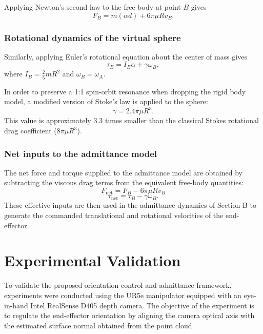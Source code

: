 \documentclass[journal]{IEEEtran}
\begin{document}
Applying Newton's second law to the free body at point $B$ gives
%
\begin{equation}
F_B = m(\alpha d) + 6\pi \mu R v_B.
\end{equation}
%
\subsubsection{Rotational dynamics of the virtual sphere}

Similarly, applying Euler's rotational equation about the center of mass gives
%
\begin{equation}
\tau_B = I_B \alpha + \gamma \omega_B,
\end{equation}
%
where $I_B = \frac{2}{5}mR^2$ and $\omega_B = \omega_A$.

In order to preserve a 1:1 spin-orbit resonance when dropping the rigid body model, a modified version of Stoke's law is applied to the sphere:
%
\begin{equation}
\gamma = 2.4\pi \mu R^3.
\end{equation}
%
This value is approximately $3.3$ times smaller than the classical Stokes rotational drag coefficient ($8\pi\mu R^3$).



\subsubsection{Net inputs to the admittance model}

The net force and torque supplied to the admittance model are obtained by subtracting the viscous drag terms from the equivalent free-body quantities:
%
\begin{equation}
F_{\mathrm{net}} = F_B - 6\pi \mu R v_B
\end{equation}
%
\begin{equation}
\tau_{\mathrm{net}} = \tau_B - \gamma \omega_B.
\end{equation}
%
These effective inputs are then used in the admittance dynamics of Section B to generate the commanded translational and rotational velocities of the end-effector.

\section{Experimental Validation}

To validate the proposed orientation control and admittance framework, experiments were conducted using the UR5e manipulator equipped with an eye-in-hand Intel RealSense D405 depth camera. The objective of the experiment is to regulate the end-effector orientation by aligning the camera optical axis with the estimated surface normal obtained from the point cloud.
\end{document}
